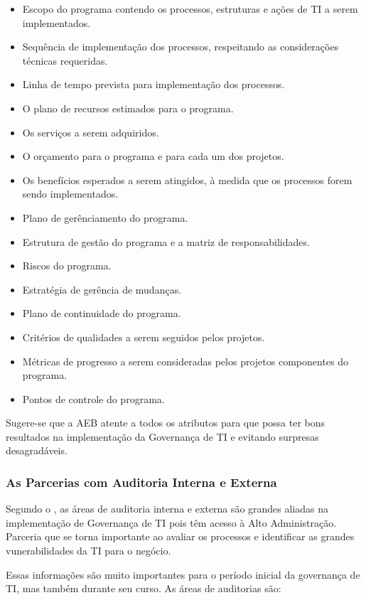 \begin{itemize}
\item Escopo do programa contendo os processos, estruturas e ações de TI a serem implementados.
\item Sequência de implementação dos processos, respeitando as considerações técnicas requeridas.
\item Linha de tempo prevista para implementação dos processos.
\item O plano de recursos estimados para o programa.
\item Os serviços a serem adquiridos.
\item O orçamento para o programa e para cada um dos projetos. 
\item Os benefícios esperados a serem atingidos, à medida que os processos forem sendo implementados.
\item Plano de gerênciamento do programa.
\item Estrutura de gestão do programa e a matriz de responsabilidades.
\item Riscos do programa.
\item Estratégia de gerência de mudanças.
\item Plano de continuidade do programa.
\item Critérios de qualidades a serem seguidos pelos projetos.
\item Métricas de progresso a serem consideradas pelos projetos componentes do programa.
\item Pontos de controle do programa.
\end{itemize}

Sugere-se que a AEB atente a todos os atributos para que possa ter bons resultados na implementação da Governança de TI e evitando surpresas desagradáveis.

\subsubsection{As Parcerias com Auditoria Interna e Externa}

Segundo o \cite{ImplantandoGTI:2012}, as áreas de auditoria interna e externa são grandes aliadas na implementação de Governança de TI pois têm acesso à Alto Administração. Parceria que se torna importante ao avaliar os processos e identificar as grandes vunerabilidades da TI para o negócio.

Essas informações são muito importantes para o período inicial da governança de TI, mas também durante seu curso. As áreas de auditorias são:

